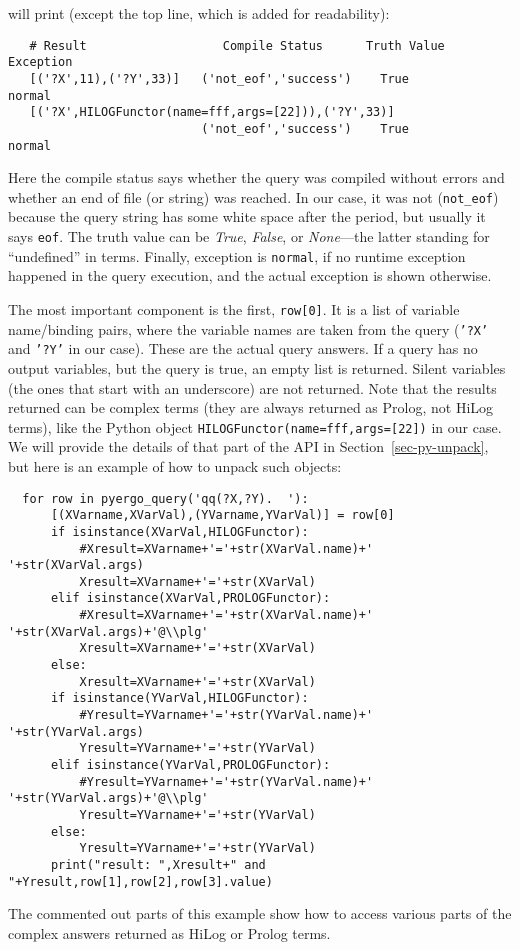 will print (except the top line, which is added for readability):
\begin{verbatim}
   # Result                   Compile Status      Truth Value    Exception
   [('?X',11),('?Y',33)]   ('not_eof','success')    True           normal
   [('?X',HILOGFunctor(name=fff,args=[22])),('?Y',33)]
                           ('not_eof','success')    True           normal
\end{verbatim}
Here the compile status says whether the query was compiled without errors
and whether an end of file (or string)
was reached. In our case, it was not (\texttt{not\_eof}) because the
query string has some white space after the period, but usually it says
\texttt{eof}. The truth value can be \emph{True}, \emph{False}, or
\emph{None}---the latter standing for ``undefined'' in \ERGO terms.    
Finally, exception is \texttt{normal}, if no runtime exception 
happened in the query execution, and the actual exception is shown
otherwise.

The most important component is the first, \texttt{row[0]}.
It is a list of variable name/binding pairs, where the variable names are
taken from the query (\texttt{'?X'} and \texttt{'?Y'} in our case).
These are the actual query answers. If a query has no output variables, but
the query is true, an empty list is returned. Silent variables (the ones
that start with an underscore) are not returned.
Note that the results returned can be complex terms (they are always returned as
Prolog, not HiLog terms), like the Python object
\texttt{HILOGFunctor(name=fff,args=[22])}  in our case.
We will provide the details of that part of the API in 
Section~\ref{sec-py-unpack},
but here is an example of how to unpack such objects:
\begin{verbatim}
  for row in pyergo_query('qq(?X,?Y).  '):
      [(XVarname,XVarVal),(YVarname,YVarVal)] = row[0]
      if isinstance(XVarVal,HILOGFunctor):
          #Xresult=XVarname+'='+str(XVarVal.name)+' '+str(XVarVal.args)
          Xresult=XVarname+'='+str(XVarVal)
      elif isinstance(XVarVal,PROLOGFunctor):
          #Xresult=XVarname+'='+str(XVarVal.name)+' '+str(XVarVal.args)+'@\\plg'
          Xresult=XVarname+'='+str(XVarVal)
      else:
          Xresult=XVarname+'='+str(XVarVal)
      if isinstance(YVarVal,HILOGFunctor):
          #Yresult=YVarname+'='+str(YVarVal.name)+' '+str(YVarVal.args)
          Yresult=YVarname+'='+str(YVarVal)
      elif isinstance(YVarVal,PROLOGFunctor):
          #Yresult=YVarname+'='+str(YVarVal.name)+' '+str(YVarVal.args)+'@\\plg'
          Yresult=YVarname+'='+str(YVarVal)
      else:
          Yresult=YVarname+'='+str(YVarVal)
      print("result: ",Xresult+" and "+Yresult,row[1],row[2],row[3].value)
\end{verbatim}
The commented out parts of this example show how to access various parts of
the complex answers returned as HiLog or Prolog terms.

